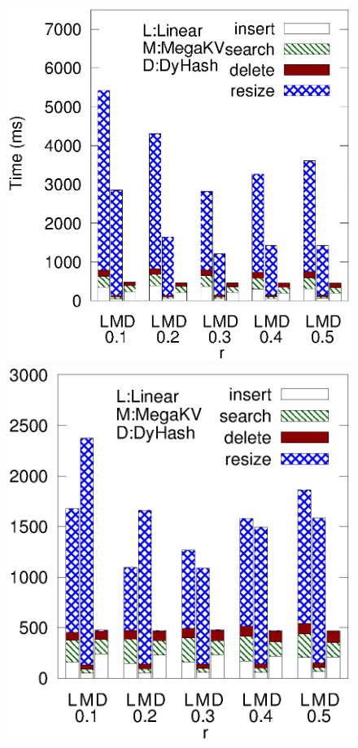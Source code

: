 \begin{figure}[htp]
	\begin{minipage}{0.19\linewidth}\centering
		\includegraphics[width=\linewidth]{pic/dynamic/twitter/diff_r.eps}
		\centerline{\dstwitter}
	\end{minipage}
	\begin{minipage}{0.19\linewidth}\centering
		\includegraphics[width=\linewidth]{pic/dynamic/reddit/diff_r.eps}

\end{minipage}
\end{figure}
